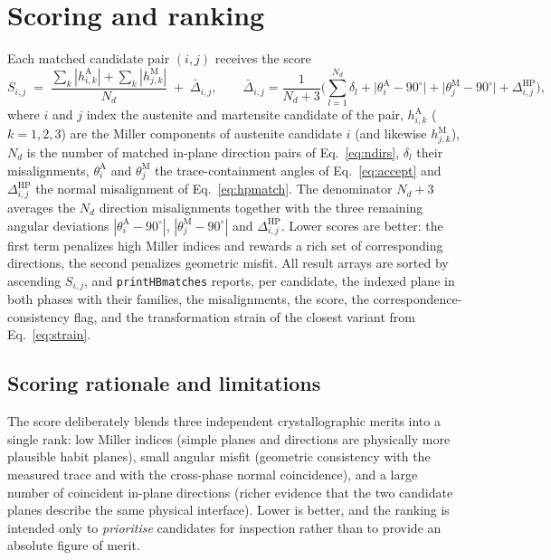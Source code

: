 \documentclass[11pt,a4paper]{article}
\begin{document}
\section{Scoring and ranking}

Each matched candidate pair $(i,j)$ receives the score
\begin{equation}
S_{i,j} \;=\; \frac{\sum_k |h^{\mathrm A}_{i,k}| + \sum_k |h^{\mathrm M}_{j,k}|}{N_d}
\;+\;
\bar\Delta_{i,j},
\qquad
\bar\Delta_{i,j}=\frac{1}{N_d+3}\Big(\sum_{l=1}^{N_d}\delta_l
+\big|\theta^{\mathrm A}_i-90^\circ\big|
+\big|\theta^{\mathrm M}_j-90^\circ\big|
+\Delta^{\mathrm{HP}}_{i,j}\Big),
\label{eq:score}
\end{equation}
where $i$ and $j$ index the austenite and martensite candidate of the pair, $h^{\mathrm A}_{i,k}$ ($k=1,2,3$) are the Miller components of austenite candidate $i$ (and likewise $h^{\mathrm M}_{j,k}$), $N_d$ is the number of matched in-plane direction pairs of Eq.~\eqref{eq:ndirs}, $\delta_l$ their misalignments, $\theta^{\mathrm A}_i$ and $\theta^{\mathrm M}_j$ the trace-containment angles of Eq.~\eqref{eq:accept} and $\Delta^{\mathrm{HP}}_{i,j}$ the normal misalignment of Eq.~\eqref{eq:hpmatch}. The denominator $N_d+3$ averages the $N_d$ direction misalignments together with the three remaining angular deviations $|\theta^{\mathrm A}_i-90^\circ|$, $|\theta^{\mathrm M}_j-90^\circ|$ and $\Delta^{\mathrm{HP}}_{i,j}$. Lower scores are better: the first term penalizes high Miller indices and rewards a rich set of corresponding directions, the second penalizes geometric misfit. All result arrays are sorted by ascending $S_{i,j}$, and \texttt{printHBmatches} reports, per candidate, the indexed plane in both phases with their families, the misalignments, the score, the correspondence-consistency flag, and the transformation strain of the closest variant from Eq.~\eqref{eq:strain}.

\subsection*{Scoring rationale and limitations}

The score deliberately blends three independent crystallographic merits into a single rank: low Miller indices (simple planes and directions are physically more plausible habit planes), small angular misfit (geometric consistency with the measured trace and with the cross-phase normal coincidence), and a large number of coincident in-plane directions (richer evidence that the two candidate planes describe the same physical interface). Lower is better, and the ranking is intended only to \emph{prioritise} candidates for inspection rather than to provide an absolute figure of merit.
\end{document}
